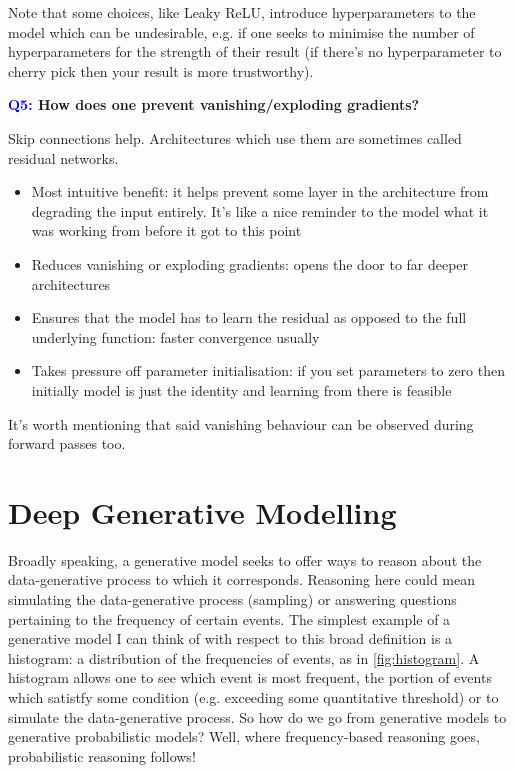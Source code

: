 \documentclass[11pt]{article}
\begin{document}
Note that some choices, like Leaky ReLU, introduce hyperparameters to the model which can be undesirable, e.g. if one seeks to minimise the number of hyperparameters for the strength of their result (if there's no hyperparameter to cherry pick then your result is more trustworthy).

\begin{center}
    \textbf{\textcolor{blue}{Q5:} How does one prevent vanishing/exploding gradients?}
\end{center}
Skip connections help. Architectures which use them are sometimes called residual networks.
\begin{itemize}
    \item Most intuitive benefit: it helps prevent some layer in the architecture from degrading the input entirely. It's like a nice reminder to the model what it was working from before it got to this point
    \item Reduces vanishing or exploding gradients: opens the door to far deeper architectures
    \item Ensures that the model has to learn the residual as opposed to the full underlying function: faster convergence usually
    \item Takes pressure off parameter initialisation: if you set parameters to zero then initially model is just the identity and learning from there is feasible
\end{itemize}
It's worth mentioning that said vanishing behaviour can be observed during forward passes too.

\section{Deep Generative Modelling}
Broadly speaking, a generative model seeks to offer ways to reason about the data-generative process to which it corresponds. Reasoning here could mean simulating the data-generative process (sampling) or answering questions pertaining to the frequency of certain events. The simplest example of a generative model I can think of with respect to this broad definition is a histogram: a distribution of the frequencies of events, as in \autoref{fig:histogram}. A histogram allows one to see which event is most frequent, the portion of events which satistfy some condition (e.g. exceeding some quantitative threshold) or to simulate the data-generative process. So how do we go from generative models to generative probabilistic models? Well, where frequency-based reasoning goes, probabilistic reasoning follows!
\end{document}
